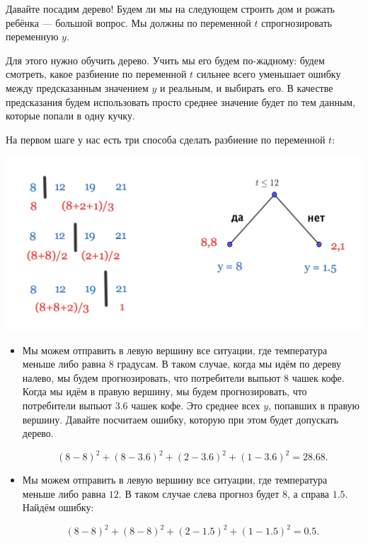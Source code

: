\documentclass[12pt, a4paper, oneside]{article}
\theoremstyle{plain} %
\theoremstyle{definition}
\begin{document}
\begin{solution}
Давайте посадим дерево! Будем ли мы на следующем строить дом и рожать ребёнка --- большой вопрос.  Мы должны по переменной $t$ спрогнозировать переменную $y$. 

Для этого нужно обучить дерево. Учить мы его будем по-жадному: будем смотреть, какое разбиение по переменной $t$ сильнее всего уменьшает ошибку между предсказанным значением $y$ и реальным, и выбирать его. В качестве предсказания будем использовать просто среднее значение будет по тем данным, которые попали в одну кучку.
	
На первом шаге у нас есть три способа сделать разбиение по переменной $t$: 

\begin{center}
    \includegraphics[scale=0.25]{reg_tree_1.png}
\end{center}
	
\begin{itemize}

    \item  	Мы можем отправить  в левую вершину все ситуации, где температура меньше либо равна 8 градусам. В таком случае, когда мы идём по дереву налево, мы будем прогнозировать, что потребители выпьют $8$ чашек кофе. Когда мы идём в правую вершину, мы будем прогнозировать, что потребители выпьют $3.6$ чашек кофе. Это среднее всех $y$, попавших в правую вершину. Давайте посчитаем ошибку, которую при этом будет допускать дерево. 

	$$
	(8 - 8)^2 + (8 - 3.6)^2 + (2 - 3.6)^2 + (1 - 3.6)^2 = 28.68.
	$$

	\item Мы можем отправить в левую вершину все ситуации, где температура меньше либо равна $12$. В таком случае слева прогноз будет $8$, а справа $1.5$. Найдём ошибку:
	
	$$
	(8 - 8)^2 + (8 - 8)^2 + (2 - 1.5)^2 + (1 - 1.5)^2 = 0.5.  $$
	

\end{itemize}
\end{solution}
\end{document}
